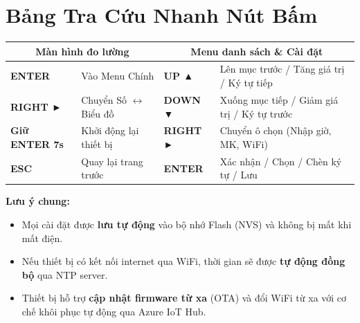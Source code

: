 \documentclass[12pt,a4paper]{article}
\begin{document}

\section{Bảng Tra Cứu Nhanh Nút Bấm}
\label{sec:button_lookup}

\begin{table}[H]
\centering
\begin{tabularx}{\textwidth}{|l|X|l|X|}
\hline
\multicolumn{2}{|c|}{\textbf{Màn hình đo lường}} & \multicolumn{2}{c|}{\textbf{Menu danh sách \& Cài đặt}} \\ \hline
\textbf{ENTER} & Vào Menu Chính & \textbf{UP ▲} & Lên mục trước / Tăng giá trị / Ký tự tiếp \\ \hline
\textbf{RIGHT ►} & Chuyển Số $\leftrightarrow$ Biểu đồ & \textbf{DOWN ▼} & Xuống mục tiếp / Giảm giá trị / Ký tự trước \\ \hline
\textbf{Giữ ENTER 7s} & Khởi động lại thiết bị & \textbf{RIGHT ►} & Chuyển ô chọn (Nhập giờ, MK, WiFi) \\ \hline
\textbf{ESC} & Quay lại trang trước & \textbf{ENTER} & Xác nhận / Chọn / Chèn ký tự / Lưu \\ \hline
\end{tabularx}
\end{table}

\begin{tipbox}
\textbf{Lưu ý chung:}
\begin{itemize}[label={-}]
    \item Mọi cài đặt được \textbf{lưu tự động} vào bộ nhớ Flash (NVS) và không bị mất khi mất điện.
    \item Nếu thiết bị có kết nối internet qua WiFi, thời gian sẽ được \textbf{tự động đồng bộ} qua NTP server.
    \item Thiết bị hỗ trợ \textbf{cập nhật firmware từ xa} (OTA) và đổi WiFi từ xa với cơ chế khôi phục tự động qua Azure IoT Hub.
\end{itemize}
\end{tipbox}
\end{document}
